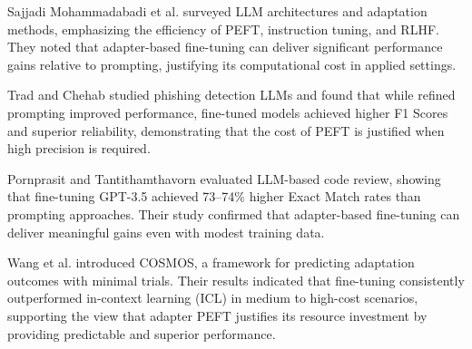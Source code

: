 \documentclass[journal,article,submit,pdftex,moreauthors]{Definitions/mdpi}
\begin{document}
Sajjadi Mohammadabadi et al. \citep{sajjadi2025survey} surveyed LLM architectures and adaptation methods, emphasizing the efficiency of PEFT, instruction tuning, and RLHF. They noted that adapter-based fine-tuning can deliver significant performance gains relative to prompting, justifying its computational cost in applied settings.

Trad and Chehab \citep{trad2024prompt} studied phishing detection LLMs and found that while refined prompting improved performance, fine-tuned models achieved higher F1 Scores and superior reliability, demonstrating that the cost of PEFT is justified when high precision is required.

Pornprasit and Tantithamthavorn \citep{pornprasit2024fine} evaluated LLM-based code review, showing that fine-tuning GPT-3.5 achieved 73–74\% higher Exact Match rates than prompting approaches. Their study confirmed that adapter-based fine-tuning can deliver meaningful gains even with modest training data.

Wang et al. \citep{wang2025cosmos} introduced COSMOS, a framework for predicting adaptation outcomes with minimal trials. Their results indicated that fine-tuning consistently outperformed in-context learning (ICL) in medium to high-cost scenarios, supporting the view that adapter PEFT justifies its resource investment by providing predictable and superior performance.
\end{document}
